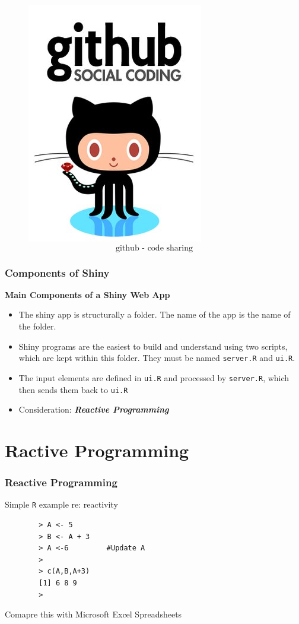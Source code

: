 \documentclass{beamer}
\begin{document}
\begin{frame}
\begin{figure}

\centering
\includegraphics[width=0.55\linewidth]{./github}
\[ \mbox{github - code sharing}  \]
\end{figure}
\Large


\end{frame}


\begin{frame}
	\frametitle{Components of Shiny}
	\Large
	\textbf{Main Components of a Shiny Web App} 
	\begin{itemize}
		\item The shiny app is structurally a folder. The name of the app is the name of the folder.
		\item  Shiny programs are the easiest to build and
		understand using two scripts, which are kept within this folder. They must be
		named \texttt{server.R} and \texttt{ui.R}.
		\item 
		The input elements are defined in
		\texttt{ui.R} and processed by \texttt{server.R}, which then sends them back to \texttt{ui.R}
		\item Consideration: \textbf{\textit{Reactive Programming}}
	\end{itemize}
	
	
\end{frame}
\section{Ractive Programming}
\begin{frame}[fragile]
	\Large
	\frametitle{Reactive Programming}
	
	Simple \texttt{R} example re: reactivity
	\begin{framed}
		\begin{verbatim}
		> A <- 5
		> B <- A + 3
		> A <-6         #Update A
		>
		> c(A,B,A+3)
		[1] 6 8 9
		>
		\end{verbatim}
	\end{framed}
	Comapre this with Microsoft Excel Spreadsheets
\end{frame}
\end{document}
